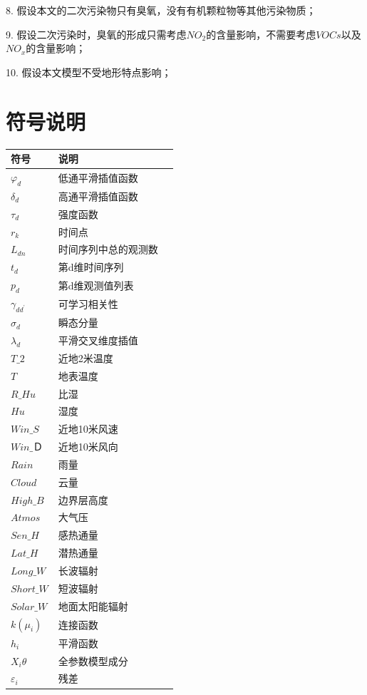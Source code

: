\documentclass[a4paper,10pt]{my_paper}
\numberwithin{equation}{section}
\begin{document}
8. 假设本文的二次污染物只有臭氧，没有有机颗粒物等其他污染物质；

9. 假设二次污染时，臭氧的形成只需考虑${NO_2}$的含量影响，不需要考虑${VOCs}$以及${NO_x}$的含量影响；

10. 假设本文模型不受地形特点影响；

\section{符号说明}

\begin{table}[htb]
    \centering
    \begin{tabular}{p{2.0cm}<{\centering}p{9.0cm}<{\centering}p{2.0cm}<{\centering}}
    \hline
    符号 & 说明 \\ %
    \hline
    $\varphi_d$ & 低通平滑插值函数 \\ %
    $\delta_d$ & 高通平滑插值函数\\ 
    $\tau_d$ & 强度函数 \\ 
    $r_k$ &  时间点 \\ 
    $L_{dn}$ & 时间序列中总的观测数 \\
    $t_d$ & 第d维时间序列 \\
    $p_d$ & 第d维观测值列表 \\
    $\gamma_{dd^{'}}$ & 可学习相关性 \\
    $\sigma_d$ & 瞬态分量 \\
    $\lambda_d$ & 平滑交叉维度插值 \\
    $T\_2$ & 近地2米温度 \\
    $T$ & 地表温度 \\
    $R\_Hu$ & 比湿 \\
    $Hu$ & 湿度 \\
    $Win\_S$ & 近地10米风速 \\
    $Win\_Ｄ$ & 近地10米风向 \\
    $Rain$ & 雨量 \\
    $Cloud$ & 云量 \\
    $High\_B$ & 边界层高度 \\
    $Atmos$ & 大气压 \\
    $Sen\_H$ & 感热通量 \\
    $Lat\_H$ & 潜热通量 \\
    $Long\_W$ & 长波辐射 \\
    $Short\_W$ & 短波辐射 \\
    $Solar\_W$ & 地面太阳能辐射 \\
    $k(\mu_i)$ & 连接函数 \\
    $h_i$ & 平滑函数 \\
    $X_i\theta$ & 全参数模型成分 \\
    $\varepsilon_i$ & 残差 \\
    \hline
    \end{tabular}
\end{table}
\end{document}
